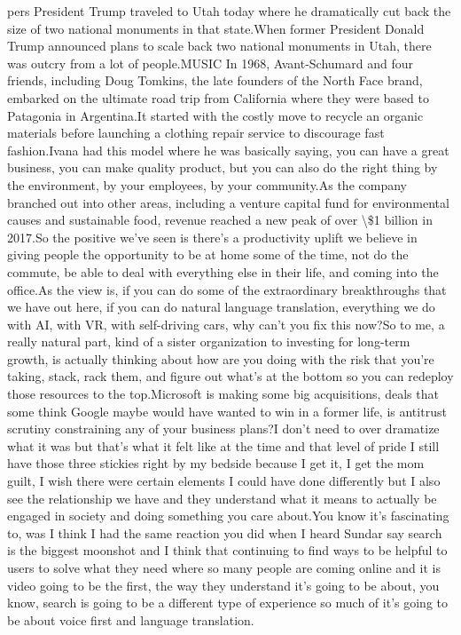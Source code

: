 \documentclass{article}%
\begin{document}
pers President Trump traveled to Utah today where he dramatically cut back the size of two national monuments in that state.When former President Donald Trump announced plans to scale back two national monuments in Utah, there was outcry from a lot of people.MUSIC In 1968, Avant{-}Schumard and four friends, including Doug Tomkins, the late founders of the North Face brand, embarked on the ultimate road trip from California where they were based to Patagonia in Argentina.It started with the costly move to recycle an organic materials before launching a clothing repair service to discourage fast fashion.Ivana had this model where he was basically saying, you can have a great business, you can make quality product, but you can also do the right thing by the environment, by your employees, by your community.As the company branched out into other areas, including a venture capital fund for environmental causes and sustainable food, revenue reached a new peak of over \textbackslash{}\$1 billion in 2017.So the positive we've seen is there's a productivity uplift we believe in giving people the opportunity to be at home some of the time, not do the commute, be able to deal with everything else in their life, and coming into the office.As the view is, if you can do some of the extraordinary breakthroughs that we have out here, if you can do natural language translation, everything we do with AI, with VR, with self{-}driving cars, why can't you fix this now?So to me, a really natural part, kind of a sister organization to investing for long{-}term growth, is actually thinking about how are you doing with the risk that you're taking, stack, rack them, and figure out what's at the bottom so you can redeploy those resources to the top.Microsoft is making some big acquisitions, deals that some think Google maybe would have wanted to win in a former life, is antitrust scrutiny constraining any of your business plans?I don't need to over dramatize what it was but that's what it felt like at the time and that level of pride I still have those three stickies right by my bedside because I get it, I get the mom guilt, I wish there were certain elements I could have done differently but I also see the relationship we have and they understand what it means to actually be engaged in society and doing something you care about.You know it's fascinating to, was I think I had the same reaction you did when I heard Sundar say search is the biggest moonshot and I think that continuing to find ways to be helpful to users to solve what they need where so many people are coming online and it is video going to be the first, the way they understand it's going to be about, you know, search is going to be a different type of experience so much of it's going to be about voice first and language translation.%
\end{document}
